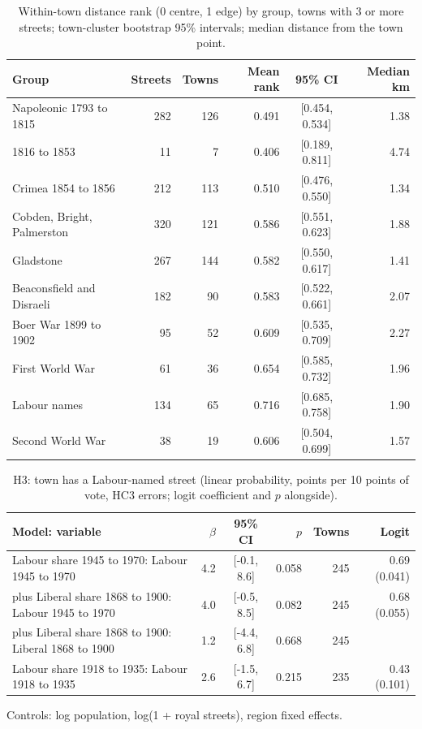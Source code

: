 \documentclass[11pt,a4paper]{article}
\begin{document}
\begin{table}[tbp]\centering\footnotesize\caption{Within-town distance rank (0 centre, 1 edge) by group, towns with 3 or more streets; town-cluster bootstrap 95\% intervals; median distance from the town point.}\label{tab:timing}\begin{tabular}{lrrrcr}\toprule Group & Streets & Towns & Mean rank & 95\% CI & Median km\\\midrule
Napoleonic 1793 to 1815 & 282 & 126 & 0.491 & [0.454, 0.534] & 1.38\\
1816 to 1853 & 11 & 7 & 0.406 & [0.189, 0.811] & 4.74\\
Crimea 1854 to 1856 & 212 & 113 & 0.510 & [0.476, 0.550] & 1.34\\
Cobden, Bright, Palmerston & 320 & 121 & 0.586 & [0.551, 0.623] & 1.88\\
Gladstone & 267 & 144 & 0.582 & [0.550, 0.617] & 1.41\\
Beaconsfield and Disraeli & 182 & 90 & 0.583 & [0.522, 0.661] & 2.07\\
Boer War 1899 to 1902 & 95 & 52 & 0.609 & [0.535, 0.709] & 2.27\\
First World War & 61 & 36 & 0.654 & [0.585, 0.732] & 1.96\\
Labour names & 134 & 65 & 0.716 & [0.685, 0.758] & 1.90\\
Second World War & 38 & 19 & 0.606 & [0.504, 0.699] & 1.57\\
\bottomrule\end{tabular}\end{table}

\begin{table}[tbp]\centering\footnotesize\begin{threeparttable}\caption{H3: town has a Labour-named street (linear probability, points per 10 points of vote, HC3 errors; logit coefficient and $p$ alongside).}\label{tab:h3}\begin{tabular}{p{6.8cm}rcrrr}\toprule Model: variable & $\beta$ & 95\% CI & $p$ & Towns & Logit\\\midrule
Labour share 1945 to 1970: Labour 1945 to 1970 & 4.2 & [-0.1, 8.6] & 0.058 & 245 & 0.69 (0.041)\\
plus Liberal share 1868 to 1900: Labour 1945 to 1970 & 4.0 & [-0.5, 8.5] & 0.082 & 245 & 0.68 (0.055)\\
plus Liberal share 1868 to 1900: Liberal 1868 to 1900 & 1.2 & [-4.4, 6.8] & 0.668 & 245 & \\
Labour share 1918 to 1935: Labour 1918 to 1935 & 2.6 & [-1.5, 6.7] & 0.215 & 235 & 0.43 (0.101)\\
\bottomrule\end{tabular}\begin{tablenotes}\footnotesize\item Controls: log population, log(1 + royal streets), region fixed effects.\end{tablenotes}\end{threeparttable}\end{table}
\end{document}
